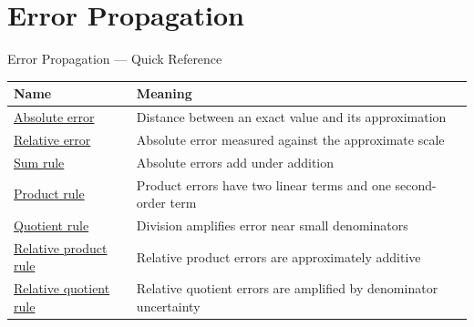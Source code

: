 \section{Error Propagation}

\begin{toolkitbox}{Error Propagation --- Quick Reference}
\small
\begin{tabular}{l l}
\toprule
\textbf{Name} & \textbf{Meaning} \\
\midrule
\hyperref[def:absolute-error-approximation]{Absolute error} & Distance between an exact value and its approximation \\
\hyperref[def:relative-error-approximation]{Relative error} & Absolute error measured against the approximate scale \\
\hyperref[thm:absolute-error-sum]{Sum rule} & Absolute errors add under addition \\
\hyperref[thm:absolute-error-product]{Product rule} & Product errors have two linear terms and one second-order term \\
\hyperref[thm:absolute-error-quotient]{Quotient rule} & Division amplifies error near small denominators \\
\hyperref[prop:relative-error-product]{Relative product rule} & Relative product errors are approximately additive \\
\hyperref[prop:relative-error-quotient]{Relative quotient rule} & Relative quotient errors are amplified by denominator uncertainty \\
\bottomrule
\end{tabular}
\end{toolkitbox}


